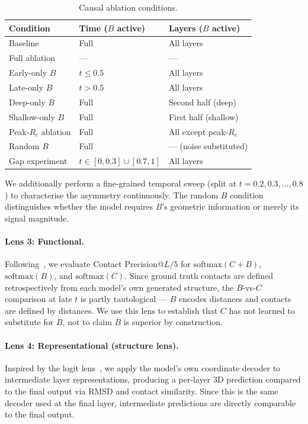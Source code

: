 \documentclass{article}
\begin{document}
\begin{table}[h]
    \centering
    \vspace{-4pt}
    \caption{Causal ablation conditions.}
    \label{tab:ablation_conditions}
    \begin{tabular}{lll}
        \toprule
        Condition & Time ($B$ active) & Layers ($B$ active) \\
        \midrule
        Baseline & Full & All layers \\
        Full ablation & --- & --- \\
        Early-only $B$ & $t \leq 0.5$ & All layers \\
        Late-only $B$ & $t > 0.5$ & All layers \\
        Deep-only $B$ & Full & Second half (deep) \\
        Shallow-only $B$ & Full & First half (shallow) \\
        Peak-$R_c$ ablation & Full & All except peak-$R_c$ \\
        Random $B$ & Full & --- (noise substituted) \\
        Gap experiment & $t \in [0, 0.3] \cup [0.7, 1]$ & All layers \\
        \bottomrule
    \end{tabular}
    \vspace{-2pt}
\end{table}

We additionally perform a fine-grained temporal sweep (split at $t = 0.2, 0.3, \ldots, 0.8$) to characterise the asymmetry continuously.
The random $B$ condition distinguishes whether the model requires $B$'s geometric information or merely its signal magnitude.

\paragraph{Lens 3: Functional.}
Following~\citet{rao2020transformer}, we evaluate Contact Precision@$L/5$ for $\mathrm{softmax}(C + B)$, $\mathrm{softmax}(B)$, and $\mathrm{softmax}(C)$.
Since ground truth contacts are defined retrospectively from each model's own generated structure, the $B$-vs-$C$ comparison at late $t$ is partly tautological --- $B$ encodes distances and contacts are defined by distances.
We use this lens to establish that $C$ has not learned to substitute for $B$, not to claim $B$ is superior by construction.

\paragraph{Lens 4: Representational (structure lens).}
Inspired by the logit lens~\citep{nostalgebraist2020logitlens}, we apply the model's own coordinate decoder to intermediate layer representations, producing a per-layer 3D prediction compared to the final output via RMSD and contact similarity.
Since this is the same decoder used at the final layer, intermediate predictions are directly comparable to the final output.
\end{document}
